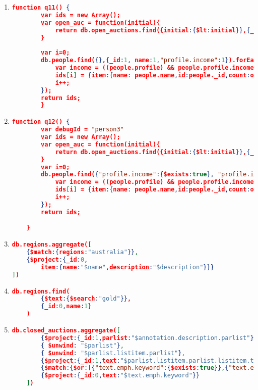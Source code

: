 \begin{enumerate}[label=Q\arabic*]
\begin{lstlisting}[language=JSON,   basicstyle=\scriptsize]
    }
	\end{lstlisting}
	
	
    \item \label{mongodb-q-11}%
	\begin{lstlisting}[language=JSON,   basicstyle=\scriptsize]
	  function q11() {
    	var ids = new Array();
    	var open_auc = function(initial){
    		return db.open_auctions.find({initial:{$lt:initial}},{_id:1}).count();
    	}
    	
    	var i=0;
    	db.people.find({},{_id:1, name:1,"profile.income":1}).forEach(function(people){
    		var income = ((people.profile) && people.profile.income)? people.profile.income/5000:0;
    		ids[i] = {item:{name: people.name,id:people._id,count:open_auc(income)}};
    		i++;
    	});
    	return ids;
        }
	\end{lstlisting}
	
	
    \item \label{mongodb-q-12}%
	\begin{lstlisting}[language=JSON,   basicstyle=\scriptsize]
	   function q12() {
    	var debugId = "person3"
    	var ids = new Array();
    	var open_auc = function(initial){
    		return db.open_auctions.find({initial:{$lt:initial}},{_id:1}).count();
    	}
    	var i=0;
    	db.people.find({"profile.income":{$exists:true}, "profile.income":{$gt:50000}},{_id:1, name:1,"profile.income":1}).forEach(function(people){
    		var income = ((people.profile) && people.profile.income)? people.profile.income/5000:0;
    		ids[i] = {item:{name: people.name,id:people._id,count:open_auc(income)}};
    		i++;
    	});
    	return ids;

    }
	\end{lstlisting}
	
	\item \label{mongodb-q-13}%
	\begin{lstlisting}[language=JSON,   basicstyle=\scriptsize]
    db.regions.aggregate([
	{$match:{regions:"australia"}},
	{$project:{_id:0,
	    item:{name:"$name",description:"$description"}}}
])
	\end{lstlisting}
	
    \item \label{mongodb-q-14}%
	\begin{lstlisting}[language=JSON,   basicstyle=\scriptsize]
	  db.regions.find(
		{$text:{$search:"gold"}},
		{_id:0,name:1}
	)
	\end{lstlisting}
	
    \item \label{mongodb-q-15}%
	\begin{lstlisting}[language=JSON,   basicstyle=\scriptsize]
	 db.closed_auctions.aggregate([
		{$project:{_id:1,parlist:"$annotation.description.parlist"}},
		{ $unwind: "$parlist"},
		{ $unwind: "$parlist.listitem.parlist"},
		{$project:{_id:1,text:"$parlist.listitem.parlist.listitem.text"}},
		{$match:{$or:[{"text.emph.keyword":{$exists:true}},{"text.emph.keyword.childtext":{$exists:true}},{"text.emph.keyword.child":{$exists:true}}]}},
		{$project:{_id:0,text:"$text.emph.keyword"}}
	])
	\end{lstlisting}
	

\end{enumerate}
